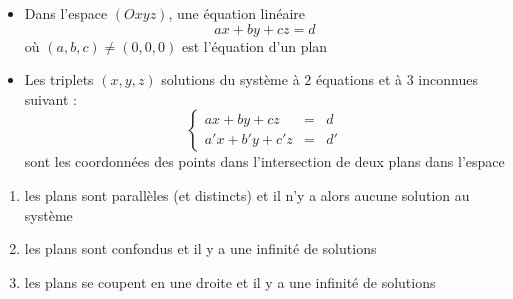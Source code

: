 \begin{frame}

\begin{itemize}
  \item Dans l'espace $(Oxyz)$, une équation linéaire 
$$a x + b y  + c z = d$$
où $(a,b,c)\neq (0,0,0)$ est l'équation d'un plan
\pause
  
  \item Les triplets $(x,y,z)$  solutions du système
à $2$ équations et à $3$ inconnues suivant : 
$$\left\{\begin{array}{rcl} 
a x + b y + c z    & = & d \\
a' x + b' y + c' z & = & d'
\end{array}\right.$$
sont les coordonnées des points dans l'intersection de deux plans dans l'espace
\end{itemize}

\pause

\begin{enumerate}
\item les plans sont parallèles (et distincts) et il n'y a alors aucune solution au système
\item les plans sont confondus et il y a une infinité de solutions
\item les plans se coupent en une droite et il y a une infinité de solutions
\end{enumerate}
\end{frame}


